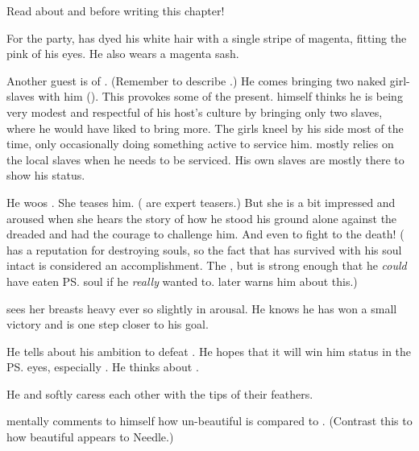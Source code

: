 \begin{garbage}
Read about \hs{\Teshrial} and \hs{\Firaxel} before writing this chapter!

For the party, \Teshrial{} has dyed his white hair with a single stripe of magenta, fitting the pink of his eyes. 
He also wears a magenta sash. 

Another guest is \hs{\Dezruth} of \Mystraacht. 
(Remember to describe .) 
He comes bringing two naked girl-slaves with him (). 
This provokes some of the \CiriathSepher{} present. 
\Dezruth{} himself thinks he is being very modest and respectful of his host's culture by bringing only two slaves, where he would have liked to bring more. 
The girls kneel by his side most of the time, only occasionally doing something active to service him. 
\Dezruth{} mostly relies on the local slaves when he needs to be serviced. 
His own slaves are mostly there to show his status. 

He woos \Firaxel. 
She teases him. 
(\Resviel{} are expert teasers.)
But she is a bit impressed and aroused when she hears the story of how he stood his ground alone against the dreaded \Ishnaruchaefir{} and had the courage to challenge him. 
And even to fight to the death! 
(\Ishnaruchaefir{} has a reputation for destroying souls, so the fact that \Teshrial{} has survived with his soul intact is considered an accomplishment.
The , but \Ishnaruchaefir{} is strong enough that he \emph{could} have eaten \ps{\Teshrial} soul if he \emph{really} wanted to.
\Menessiaraid{} later warns him about this.)

\Teshrial{} sees her breasts heavy ever so slightly in arousal. 
He knows he has won a small victory and is one step closer to his goal. 

He tells about his ambition to defeat . 
He hopes that it will win him status in the \ps{\resviel}{} eyes, especially \Firaxel. 
He thinks about . 


He and \Firaxel{} softly caress each other with the tips of their feathers. 

\Teshrial{} mentally comments to himself how un-beautiful \Achsah{} is compared to \Firaxel. 
(Contrast this to how beautiful \Achsah{} appears to Needle.) 


\end{garbage}
